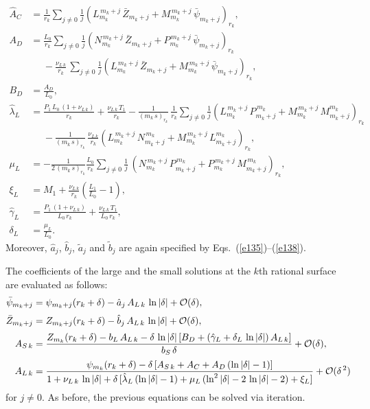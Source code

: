 \documentclass[12pt,prb,aps]{revtex4-1}
\begin{document}
\begin{align}
\hat{A}_{C} &= \frac{1}{r_k}\sum_{j\neq 0}\frac{1}{j}\left(L_{m_k}^{\,m_k+j}\,\bar{Z}_{m_k+j}+ M_{m_k}^{\,m_k+j}\,\bar{\psi}_{m_k+j}\right)_{r_k},\\[0.5ex]
A_{D} &=  \frac{L_0}{r_k}\sum_{j\neq 0}\frac{1}{j}\left(N_{m_k}^{\,m_k+j}\,\bar{Z}_{m_k+j}+ P_{m_k}^{\,m_k+j}\,\bar{\psi}_{m_k+j}\right)_{r_k}
\nonumber\\[0.5ex]&\phantom{=}-
\frac{\nu_{L\,k}}{r_k}\,\sum_{j\neq 0}\frac{1}{j}\left(L_{m_k}^{\,m_k+j}\,\bar{Z}_{m_k+j}+ M_{m_k}^{\,m_k+j}\,\bar{\psi}_{m_k+j}\right)_{r_k},
\\[0.5ex]
B_{D} &= \frac{A_{D}}{L_0},\\[0.5ex]
\hat{\lambda}_{L} &= \frac{P_1\,L_0\,(1+\nu_{L\,k}) }{r_k} + \frac{\nu_{L\,k}\,T_1}{r_k}
-\frac{1}{(m_k\,s)_{r_k}}\,\frac{1}{r_k}\sum_{j\neq 0}\frac{1}{j}\left(L_{m_k}^{\,m_k+j}\,P_{m_k+j}^{\,m_k}+M_{m_k}^{\,m_k+j}\,M_{m_k+j}^{m_k}\right)_{r_k}\nonumber\\[0.5ex]&\phantom{=}
- \frac{1}{(m_k\,s)_{r_k}}\,\frac{\nu_{L\,k}}{r_k}
\left(L_{m_k}^{\,m_k+j}\,N_{m_k+j}^{\,m_k}+M_{m_k}^{\,m_k+j}\,L_{m_k+j}^{m_k}\right)_{r_k},\\[0.5ex]
\mu_{L}&= -\frac{1}{2\,(m_k\,s)_{r_k}}\frac{L_0}{r_k}\sum_{j\neq 0}\frac{1}{j}\,(N_{m_k}^{\,m_k+j}\,P_{m_k+j}^{\,m_k}+P_{m_k}^{\,m_k+j}\,M_{m_k+j}^{\,m_k})_{r_k},\\[0.5ex]
\xi_{L} &= M_1+ \frac{\nu_{L\,k}}{r_k} \left(\frac{L_1}{L_0}-1\right),\\[0.5ex]
\hat{\gamma}_{L} &=\frac{P_1\,(1+\nu_{L\,k})}{L_0\,r_k} + \frac{\nu_{L\,k}\,T_1}{L_0\,r_k},\\[0.5ex]
\delta_{L} &= \frac{\mu_{L}}{L_0}.
\end{align}
Moreover, $\hat{a}_j$, $\hat{b}_j$, $\tilde{a}_j$ and $\tilde{b}_j$ are again specified by Eqs.~(\ref{e135})--(\ref{e138}). 

The coefficients of the large and the small solutions at the $k$th rational surface are evaluated as follows:
\begin{align}
\bar{\psi}_{m_k+j} &= \psi_{m_k+j}(r_k+\delta)- \hat{a}_j\,A_{L\,k}\,\ln|\delta| +{\cal O}(\delta),\\[0.5ex]
\bar{Z}_{m_k+j}&= Z_{m_k+j}(r_k+\delta)-\hat{b}_j\,A_{L\,k}\,\ln|\delta|+{\cal O}(\delta),\\[0.5ex]
A_{S\,k} &= \frac{Z_{m_k}(r_k+\delta)-b_{L}\,A_{L\,k}-\delta\,\ln|\delta|\,[B_D+(\hat{\gamma}_L+\delta_L\,\ln|\delta|)\,A_{L\,k}]}
{b_S\,\delta}+{\cal O}(\delta),\\[0.5ex]
A_{L\,k} &= \frac{\psi_{m_k}(r_k+\delta)-\delta\,[A_{S\,k}+A_C+A_D\,(\ln|\delta|-1)]}
{1+\nu_{L\,k}\,\ln|\delta|+\delta\,[\hat{\lambda}_L\,(\ln|\delta|-1)+ \mu_L\,(\ln^2|\delta|-2\,\ln|\delta|-2)+\xi_L]}+{\cal O}(\delta^{\,2})
\end{align}
for $j\neq 0$. As before, the previous equations can be solved via iteration.
\end{document}
